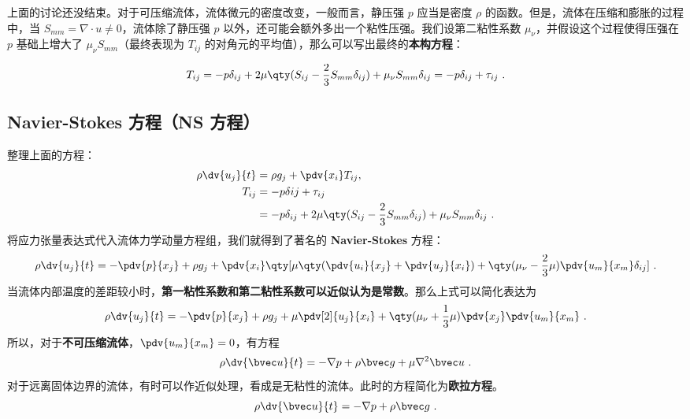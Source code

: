 上面的讨论还没结束。对于可压缩流体，流体微元的密度改变，一般而言，静压强 $p$ 应当是密度 $\rho$ 的函数。但是，流体在压缩和膨胀的过程中，当 $S_{mm}=\nabla\cdot u\neq 0$，流体除了静压强 $p$ 以外，还可能会额外多出一个粘性压强。我们设第二粘性系数 $\mu_\nu$，并假设这个过程使得压强在 $p$ 基础上增大了 $\mu_\nu S_{mm}$（最终表现为 $T_{ij}$ 的对角元的平均值），那么可以写出最终的\textbf{本构方程}：

\begin{equation}\label{eq_NSeq_1}
T_{ij}=-p\delta_{ij}+2\mu \qty(S_{ij}-\frac{2}{3}S_{mm}\delta_{ij})+\mu_\nu S_{mm} \delta_{ij}=-p\delta_{ij}+\tau_{ij}~.
\end{equation}

\subsection{Navier-Stokes 方程（NS 方程）}
整理上面的方程：
\begin{equation}
\begin{aligned}
\rho \dv{u_j}{t}&=\rho g_j+\pdv{x_i} T_{ij},\\
T_{ij}&=-p\delta{ij}+\tau_{ij}\\
&=-p\delta_{ij}+2\mu \qty(S_{ij}-\frac{2}{3}S_{mm}\delta_{ij})+\mu_\nu S_{mm} \delta_{ij}~.
\end{aligned}
\end{equation}
将应力张量表达式代入流体力学动量方程组，我们就得到了著名的 \textbf{Navier-Stokes} 方程：
\begin{equation}
\rho \dv{u_j}{t}=-\pdv{p}{x_j}+\rho g_j+\pdv{x_i} \qty[\mu\qty(\pdv{u_i}{x_j}+\pdv{u_j}{x_i})+\qty(\mu_\nu-\frac{2}{3}\mu)\pdv{u_m}{x_m}\delta_{ij}]~.
\end{equation}
当流体内部温度的差距较小时，\textbf{第一粘性系数和第二粘性系数可以近似认为是常数}。那么上式可以简化表达为
\begin{equation}\label{eq_NSeq_2}
\rho \dv{u_j}{t}=-\pdv{p}{x_j}+\rho g_j+\mu\pdv[2]{u_j}{x_i} +\qty(\mu_\nu+\frac{1}{3}\mu)\pdv{x_j}\pdv{u_m}{x_m}~.
\end{equation}
所以，对于\textbf{不可压缩流体}，$\pdv{u_m}{x_m}=0$，有方程
\begin{equation}
\rho \dv{\bvec u}{t}=-\nabla p+\rho \bvec g+\mu \nabla^2 \bvec u~.
\end{equation}
对于远离固体边界的流体，有时可以作近似处理，看成是无粘性的流体。此时的方程简化为\textbf{欧拉方程}。
\begin{equation}
\rho \dv{\bvec u}{t}=-\nabla p+\rho \bvec g~.
\end{equation}
